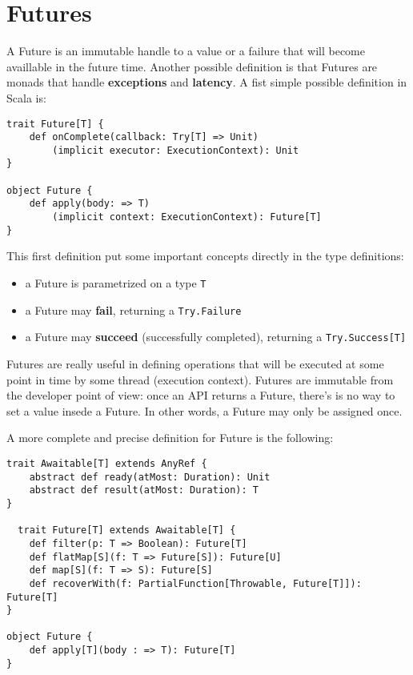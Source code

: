 \section{Futures}\label{futures}

A Future is an immutable handle to a value or a failure that will become
availlable in the future time. Another possible definition is that
Futures are monads that handle \textbf{exceptions} and
\textbf{latency}. A fist simple possible definition in Scala is:

\begin{verbatim}
trait Future[T] {
    def onComplete(callback: Try[T] => Unit)
        (implicit executor: ExecutionContext): Unit
}

object Future {
    def apply(body: => T)
        (implicit context: ExecutionContext): Future[T]
}
\end{verbatim}

This first definition put some important concepts directly in the type
definitions:

\begin{itemize}
\itemsep1pt\parskip0pt
\item
  a Future is parametrized on a type \texttt{T}
\item
  a Future may \textbf{fail}, returning a \texttt{Try.Failure}
\item
  a Future may \textbf{succeed} (successfully completed), returning a
  \texttt{Try.Success{[}T{]}}
\end{itemize}

Futures are really useful in defining operations that will be executed
at some point in time by some thread (execution context). Futures are
immutable from the developer point of view: once an API returns a
Future, there's is no way to set a value insede a Future. In other
words, a Future may only be assigned once.

A more complete and precise definition for Future is the following:

\begin{verbatim}
trait Awaitable[T] extends AnyRef {
    abstract def ready(atMost: Duration): Unit
    abstract def result(atMost: Duration): T
}

￼￼trait Future[T] extends Awaitable[T] {
    def filter(p: T => Boolean): Future[T]
    def flatMap[S](f: T => Future[S]): Future[U]
    def map[S](f: T => S): Future[S]
    def recoverWith(f: PartialFunction[Throwable, Future[T]]): Future[T]
}

object Future {
    def apply[T](body : => T): Future[T]
}
\end{verbatim}

